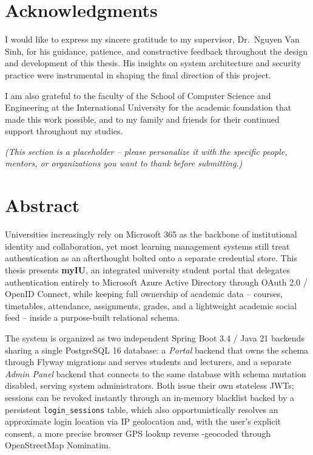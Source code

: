 \documentclass[12pt,a4paper]{report}
\begin{document}
\section*{Acknowledgments}

I would like to express my sincere gratitude to my supervisor, Dr.\
Nguyen Van Sinh, for his guidance, patience, and constructive feedback
throughout the design and development of this thesis. His insights on
system architecture and security practice were instrumental in shaping
the final direction of this project.

I am also grateful to the faculty of the School of Computer Science and
Engineering at the International University for the academic foundation
that made this work possible, and to my family and friends for their
continued support throughout my studies.

\emph{(This section is a placeholder -- please personalize it with the
specific people, mentors, or organizations you want to thank before
submitting.)}

\newpage
\tableofcontents
\listoftables
\listoffigures

\newpage
\section*{Abstract}

Universities increasingly rely on Microsoft 365 as the backbone of
institutional identity and collaboration, yet most learning management
systems still treat authentication as an afterthought bolted onto a
separate credential store. This thesis presents \textbf{myIU}, an
integrated university student portal that delegates authentication
entirely to Microsoft Azure Active Directory through OAuth 2.0 /
OpenID Connect, while keeping full ownership of academic data --
courses, timetables, attendance, assignments, grades, and a lightweight
academic social feed -- inside a purpose-built relational schema.

The system is organized as two independent Spring Boot 3.4 / Java 21
backends sharing a single PostgreSQL 16 database: a \emph{Portal}
backend that owns the schema through Flyway migrations and serves
students and lecturers, and a separate \emph{Admin Panel} backend that
connects to the same database with schema mutation disabled, serving
system administrators. Both issue their own stateless JWTs; sessions can
be revoked instantly through an in-memory blacklist backed by a
persistent \texttt{login\_sessions} table, which also opportunistically
resolves an approximate login location via IP geolocation and, with the
user's explicit consent, a more precise browser GPS lookup reverse
-geocoded through OpenStreetMap Nominatim.
\end{document}
